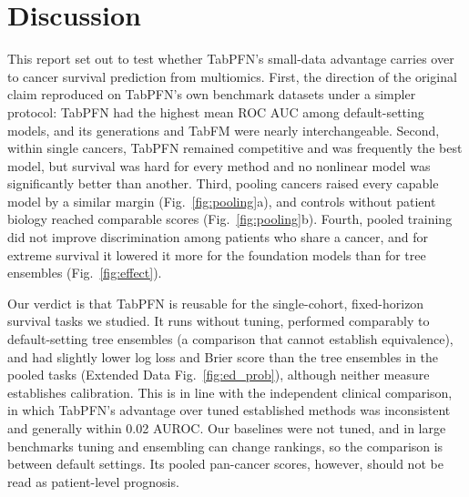 \documentclass[pdflatex,sn-nature]{sn-jnl}
\begin{document}
\FloatBarrier

\section*{Discussion}

This report set out to test whether TabPFN's small-data advantage carries over to cancer survival prediction from multiomics. First, the direction of the original claim reproduced on TabPFN's own benchmark datasets under a simpler protocol: TabPFN had the highest mean ROC AUC among default-setting models, and its generations and TabFM were nearly interchangeable. Second, within single cancers, TabPFN remained competitive and was frequently the best model, but survival was hard for every method and no nonlinear model was significantly better than another. Third, pooling cancers raised every capable model by a similar margin (Fig.~\ref{fig:pooling}a), and controls without patient biology reached comparable scores (Fig.~\ref{fig:pooling}b). Fourth, pooled training did not improve discrimination among patients who share a cancer, and for extreme survival it lowered it more for the foundation models than for tree ensembles (Fig.~\ref{fig:effect}).

Our verdict is that TabPFN is reusable for the single-cohort, fixed-horizon survival tasks we studied. It runs without tuning, performed comparably to default-setting tree ensembles (a comparison that cannot establish equivalence), and had slightly lower log loss and Brier score than the tree ensembles in the pooled tasks (Extended Data Fig.~\ref{fig:ed_prob}), although neither measure establishes calibration.\citep{van2019calibration} This is in line with the independent clinical comparison, in which TabPFN's advantage over tuned established methods was inconsistent and generally within 0.02 AUROC.\citep{shaktah2026established} Our baselines were not tuned, and in large benchmarks tuning and ensembling can change rankings,\citep{erickson2025tabarena} so the comparison is between default settings. Its pooled pan-cancer scores, however, should not be read as patient-level prognosis.
\end{document}
